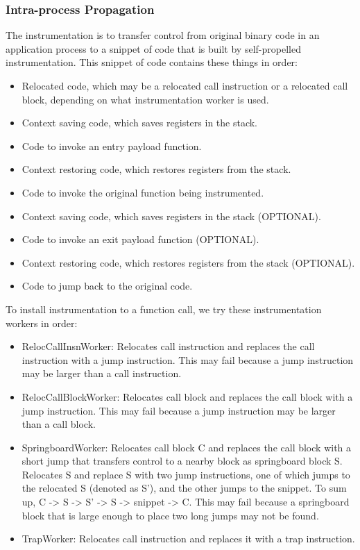 \subsubsection{Intra-process Propagation} \label{sec:intrainst}

The instrumentation is to transfer control from original binary code in an
application process to a snippet of code that is built by self-propelled
instrumentation. This snippet of code contains these things in order:
\begin{itemize}
\item Relocated code, which may be a relocated call instruction or a relocated
  call block, depending on what instrumentation worker is used.
\item Context saving code, which saves registers in the stack.
\item Code to invoke an entry payload function.
\item Context restoring code, which restores registers from the stack.
\item Code to invoke the original function being instrumented.
\item Context saving code, which saves registers in the stack (OPTIONAL).
\item Code to invoke an exit payload function (OPTIONAL).
\item Context restoring code, which restores registers from the stack (OPTIONAL).
\item Code to jump back to the original code.
\end{itemize}

To install instrumentation to a function call, we try these instrumentation
workers in order:
\begin{itemize}
\item RelocCallInsnWorker: Relocates call instruction and replaces the call
  instruction with a jump instruction. This may fail because a jump instruction
  may be larger than a call instruction.
\item RelocCallBlockWorker: Relocates call block and replaces the call block with
  a jump instruction. This may fail because a jump instruction may be larger
  than a call block.
\item SpringboardWorker: Relocates call block C and replaces the call block with
  a short jump that transfers control to a nearby block as springboard block
  S. Relocates S and replace S with two jump instructions, one of which jumps to
  the relocated S (denoted as S'), and the other jumps to the snippet. To sum
  up, C -> S -> S' -> S -> snippet -> C. This may fail because a springboard
  block that is large enough to place two long jumps may not be found.
\item TrapWorker: Relocates call instruction and replaces it with a trap
  instruction.
\end{itemize}

